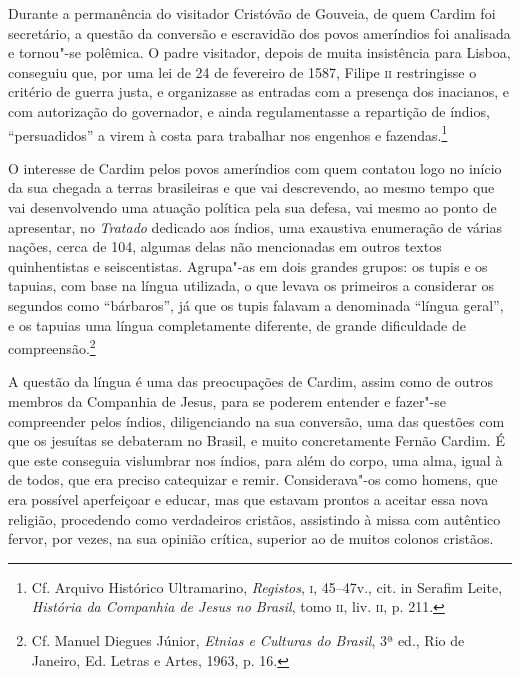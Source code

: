 Durante a permanência do visitador Cristóvão de Gouveia, de quem
Cardim foi secretário, a questão da conversão e escravidão dos povos
ameríndios foi analisada e tornou"-se polêmica. O padre visitador,
depois de muita insistência para Lisboa, conseguiu que, por uma lei de
24 de fevereiro de 1587, Filipe \textsc{ii} restringisse o critério de guerra
justa, e organizasse as entradas com a presença dos inacianos, e com
autorização do governador, e ainda regulamentasse a repartição de
índios, ``persuadidos'' a virem à costa para trabalhar nos engenhos e
fazendas.\footnote{ Cf. Arquivo Histórico Ultramarino,
\textit{Registos}, \textsc{i}, 45--47v., cit. in Serafim Leite, \textit{História
da Companhia de Jesus no Brasil}, tomo \textsc{ii}, liv. \textsc{ii}, p. 211.}

O interesse de Cardim pelos povos ameríndios com quem contatou logo
no início da sua chegada a terras brasileiras e que vai descrevendo, ao
mesmo tempo que vai desenvolvendo uma atuação política pela sua
defesa, vai mesmo ao ponto de apresentar, no \textit{Tratado} dedicado
aos índios, uma exaustiva enumeração de várias nações, cerca de 104, 
algumas delas não mencionadas em outros textos quinhentistas e
seiscentistas. Agrupa"-as em dois grandes grupos: os tupis e os
tapuias, com base na língua utilizada, o que levava os
primeiros a considerar os segundos como ``bárbaros'', já que os tupis
falavam a denominada ``língua geral'', e os tapuias uma língua
completamente diferente, de grande dificuldade de
compreensão.\footnote{ Cf. Manuel Diegues Júnior, \textit{Etnias e
Culturas do Brasil}, 3ª ed., Rio de Janeiro, Ed. Letras e Artes, 1963, p. 16.}

A questão da língua é uma das preocupações de Cardim, assim
como de outros membros da Companhia de Jesus, para se poderem entender
e fazer"-se compreender pelos índios, diligenciando na sua conversão, 
uma das questões com que os jesuítas se debateram no Brasil, e muito
concretamente Fernão Cardim. É que este conseguia vislumbrar nos
índios, para além do corpo, uma alma, igual à de todos, que era preciso
catequizar e remir. Considerava"-os como homens, que era possível
aperfeiçoar e educar, mas que estavam prontos a aceitar essa nova
religião, procedendo como verdadeiros cristãos, assistindo à missa com
autêntico fervor, por vezes, na sua opinião crítica, superior ao de
muitos colonos cristãos.

